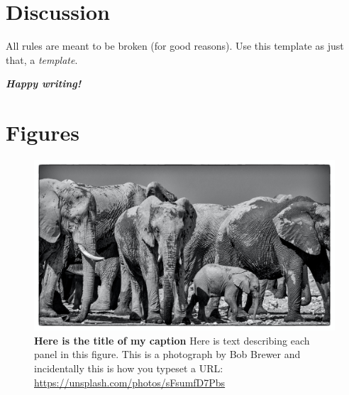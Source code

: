 \documentclass{getwriting}
\begin{document}
\section{Discussion}
All rules are meant to be broken (for good reasons). Use this template as just that, a \textit{template}. 
\par
\begin{center}
    \Large{\textit{\textbf{Happy writing!}}}
\end{center}
\newpage
\section{Figures}\label{figures}
\begin{figure}[H]
\label{fig:figure1}
\includegraphics[width=5.25in]{figures/testPicture.jpg}
\caption{\textbf{Here is the title of my caption} Here is text describing each panel in this figure. This is a photograph by Bob Brewer and incidentally this is how you typeset a URL: \url{https://unsplash.com/photos/sFsumfD7Pbs}}
\end{figure}
\newpage
\end{document}
